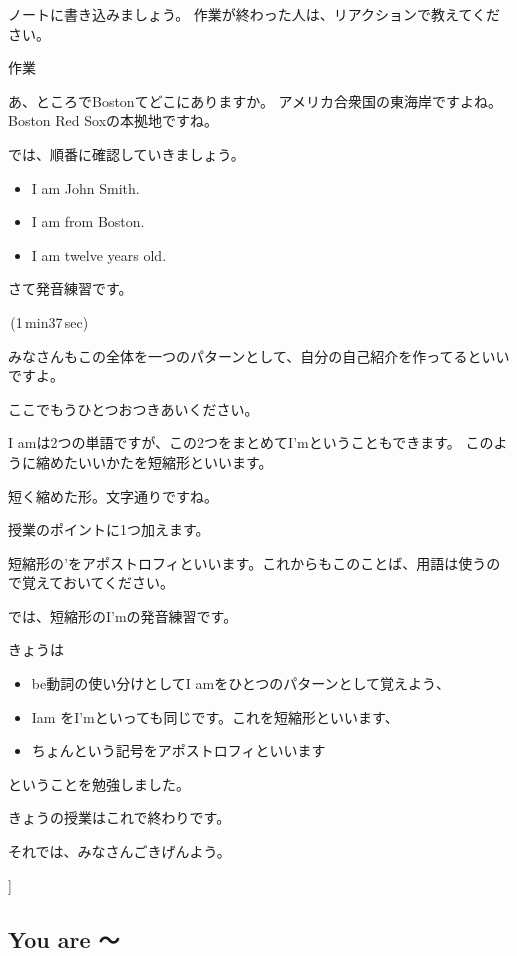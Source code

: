 \documentclass[12pt]{jlreq}
\begin{document}
ノートに書き込みましょう。
作業が終わった人は、リアクションで教えてください。

\hrulefill{}

\hfill{}作業\hfill{}

\hrulefill


あ、ところでBostonてどこにありますか。
アメリカ合衆国の東海岸ですよね。
Boston Red Soxの本拠地ですね。

では、順番に確認していきましょう。

\begin{itemize}
 \item I am John Smith.
 \item I am from Boston.
 \item I am twelve years old.
\end{itemize}

さて発音練習です。

\faVolumeUp\,(1\,min37\,sec)

みなさんもこの全体を一つのパターンとして、自分の自己紹介を作ってるといいですよ。


ここでもうひとつおつきあいください。

{\large \ComputerMouse}

I amは2つの単語ですが、この2つをまとめてI'mということもできます。
このように縮めたいいかたを短縮形といいます。

短く縮めた形。文字通りですね。

授業のポイントに1つ加えます。

短縮形の'をアポストロフィといいます。これからもこのことば、用語は使うので覚えておいてください。


では、短縮形のI'mの発音練習です。

きょうは
\begin{itemize}
 \item be動詞の使い分けとしてI amをひとつのパターンとして覚えよう、
 \item Iam をI'mといっても同じです。これを短縮形といいます、
 \item ちょんという記号をアポストロフィといいます
\end{itemize}
ということを勉強しました。

きょうの授業はこれで終わりです。

それでは、みなさんごきげんよう。


{\large \ComputerMouse}]

\newpage
\subsection{You are 〜}
{\large \ComputerMouse}
\end{document}

